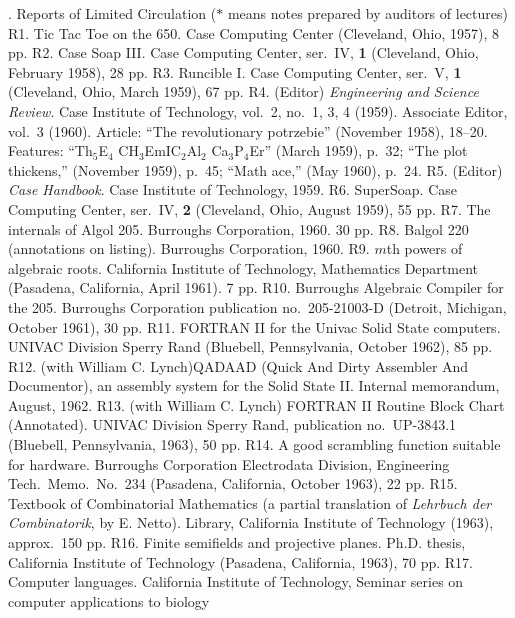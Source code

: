 \finishpage

. {Reports of Limited Circulation \rm
($\ast$ means notes prepared by auditors of lectures)}
\p R1.  Tic Tac Toe on the 650.  Case Computing Center
 (Cleveland, Ohio, 1957), 8 pp.
\p R2.  Case Soap III\null.  Case Computing Center, ser.\ IV, {\bf 1}
 (Cleveland, Ohio, February 1958), 28 pp.  
\p R3.  Runcible I.  Case Computing Center, ser.\ V, {\bf 1}
 (Cleveland, Ohio, March 1959), 67 pp.  
\p R4.  (Editor)  {\sl Engineering and Science Review}.  
 Case Institute of Technology, vol.\ 2, no.\ 1, 3, 4 (1959).  Associate
 Editor, vol.\  3 (1960).  Article: ``The revolutionary potrzebie''
 (November 1958), 18--20. Features: ``Th$_5$E$_4$ CH$_3$EmIC$_2$Al$_2$
 Ca$_3$P\kern-1pt$_4$Er'' (March 1959), p.\ 32;
 ``The plot thickens,'' (November 1959), p.\ 45;
 ``Math ace,'' (May 1960), p.\ 24.
\p R5.  (Editor)  {\sl Case Handbook}.  Case
 Institute of Technology, 1959.  
\p R6.  SuperSoap.  Case Computing Center, 
 ser.\ IV, {\bf 2} (Cleveland, Ohio, August 1959), 55 pp.  
\p R7.  The internals of Algol 205.  Burroughs Corporation, 1960.  30 pp.  
\p R8.  Balgol 220 (annotations on listing).  Burroughs Corporation, 1960.  
\p R9.  $m$th powers of algebraic roots.  California Institute of
 Technology, Mathematics Department (Pasadena, California, April 1961). 7 pp.  
\p R10.  Burroughs Algebraic Compiler for the 205.  Burroughs
 Corporation publication no.\ 205-21003-D (Detroit, Michigan,
 October 1961), 30 pp.  
\p R11.  FORTRAN II for the Univac Solid State computers.  UNIVAC
 Division Sperry Rand (Bluebell, Pennsylvania, October 1962), 85 pp.
\p R12. (with William C. Lynch)\xskip QADAAD (Quick And Dirty Assembler And
 Documentor), an assembly system for the Solid State II\null. Internal
 memorandum, August, 1962.
\p R13. (with William C. Lynch)\xskip
 FORTRAN II Routine Block Chart (Annotated).  UNIVAC Division Sperry
 Rand, publication no.\ UP-3843.1 (Bluebell, Pennsylvania, 1963), 50 pp.  
\p R14.  A good scrambling function suitable for hardware.  Burroughs
 Corporation Electrodata Division, Engineering Tech.\ Memo.\ No.\ 234
 (Pasadena, California, October 1963), 22 pp.  
\p R15.  Textbook of Combinatorial Mathematics (a partial translation
 of {\sl Lehrbuch der Combinatorik}, by E. Netto). 
 Library, California Institute of Technology (1963), approx.\ 150 pp.  
\p R16.  Finite semifields and projective planes.
 Ph.D. thesis, California Institute of Technology (Pasadena, California, 1963),
 70 pp.
\p R17.  Computer languages.  California Institute of Technology,
 Seminar series on computer applications to biology
